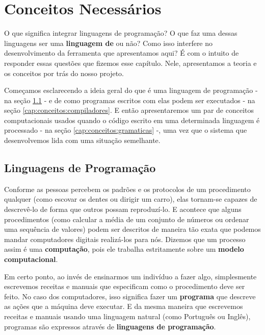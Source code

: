
\chapter{Conceitos Necessários}
\label{cap:conceitos}

  O que significa integrar linguagens de programação? O que faz uma dessas
  linguagens ser uma \textbf{linguagem de \script{}} ou não? Como isso interfere
  no desenvolvimento da ferramenta que apresentamos aqui? É com o intuito de
  responder essas questões que fizemos esse capítulo. Nele, apresentamos a
  teoria e os conceitos por trás do nosso projeto.

  Começamos esclarecendo a ideia geral do que é uma linguagem de programação -
  na seção \ref{cap:conceitos:linguagens} - e de como programas escritos com
  elas podem ser executados - na seção \ref{cap:conceitos:compiladores}.
  E então apresentaremos um par de conceitos computacionais usados
  quando o código escrito em uma determinada linguagem é processado - na seção
  \ref{cap:conceitos:gramaticas} -, uma vez que o sistema que desenvolvemos lida
  com uma situação semelhante.

  \section{Linguagens de Programação}
  \label{cap:conceitos:linguagens}

  Conforme as pessoas percebem os padrões e os protocolos de um procedimento
  qualquer (como escovar os dentes ou dirigir um carro), elas tornam-se capazes
  de descrevê-lo de forma que outros possam reproduzí-lo. E acontece que alguns
  procedimentos (como calcular a média de um conjunto de números ou ordenar uma
  sequência de valores) podem ser descritos de maneira tão exata que podemos
  mandar computadores digitais realizá-los para nós. Dizemos que um processo
  assim é uma \textbf{computação}, pois ele trabalha estritamente sobre um
  \textbf{modelo computacional}.
  
  Em certo ponto, ao invés de ensinarmos um indivíduo a fazer algo, simplesmente
  escrevemos receitas e manuais que especificam como o procedimento deve ser
  feito. No caso dos computadores, isso significa fazer um \textbf{programa}
  que descreve as ações que a máquina deve executar. E da mesma maneira que
  escrevemos receitas e manuais usando uma linguagem natural (como Português ou
  Inglês), programas são expressos através de \textbf{linguagens de
  programação}.

